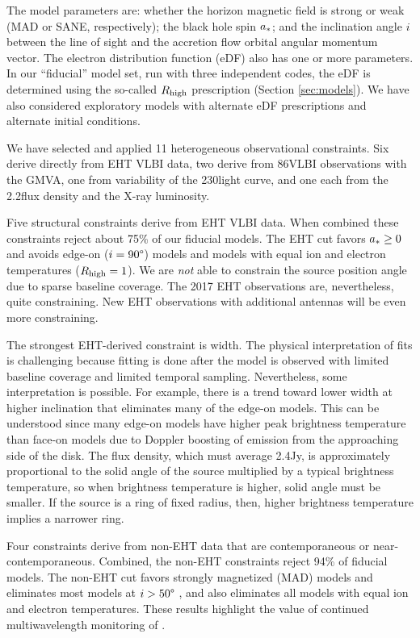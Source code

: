 The model parameters are: whether the horizon magnetic field is strong or weak (MAD or SANE, respectively); the black hole spin $a_*$; and the inclination angle $i$ between the line of sight and the accretion flow orbital angular momentum vector.
The electron distribution function (eDF) also has one or more parameters.
In our ``fiducial'' model set, run with three independent codes, the eDF is determined using the so-called $R_\mathrm{high}$ prescription (Section \ref{sec:models}).
We have also considered exploratory models with alternate eDF prescriptions and alternate initial conditions.

We have selected and applied 11 heterogeneous observational constraints.
Six derive directly from EHT VLBI data, two derive from 86\GHz VLBI observations with the GMVA, one from variability of the 230\GHz light curve, and one each from the 2.2\um flux density and the X-ray luminosity.

Five structural constraints derive from EHT VLBI data.
When combined these constraints reject about 75\% of our fiducial models.
The EHT cut favors $a_* \ge 0$ and avoids edge-on ($i = 90\degree$) models and models with equal ion and electron temperatures ($R_\mathrm{high} = 1$).
We are {\em not} able to constrain the source position angle due to sparse baseline coverage.
The 2017 EHT observations are, nevertheless, quite constraining.  New EHT observations with additional antennas will be even more constraining.

The strongest EHT-derived constraint is \mring width.  The physical interpretation of \mring fits is challenging because fitting is done after the model is observed with limited baseline coverage and limited temporal sampling.  Nevertheless, some interpretation is possible.  For example, there is a trend toward lower width at higher inclination that eliminates many of the edge-on models. This can be understood since many edge-on models have higher peak brightness temperature than face-on models due to Doppler boosting of emission from the approaching side of the disk. The flux density, which must average 2.4Jy, is approximately proportional to the solid angle of the source multiplied by a typical brightness temperature, so when brightness temperature is higher, solid angle must be smaller.  If the source is a ring of fixed radius, then, higher brightness temperature implies a narrower ring.

Four constraints derive from non-EHT data that are contemporaneous or near-contemporaneous.
Combined, the non-EHT constraints reject 94\% of fiducial models.
The non-EHT cut favors strongly magnetized (MAD) models and eliminates most models at $i > 50\degree$ \citep[consistent with interpretations of GRAVITY results][]{2020A&A...643A..56G}, and also eliminates all models with equal ion and electron temperatures.
These results highlight the value of continued multiwavelength monitoring of \sgra.

